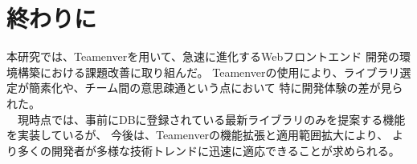\documentclass[main]{subfiles}
\begin{document}
\section{終わりに}
本研究では、Teamenverを用いて、急速に進化するWebフロントエンド
開発の環境構築における課題改善に取り組んだ。
Teamenverの使用により、ライブラリ選定が簡素化や、チーム間の意思疎通という点において
特に開発体験の差が見られた。\\
　現時点では、事前にDBに登録されている最新ライブラリのみを提案する機能を実装しているが、
今後は、Teamenverの機能拡張と適用範囲拡大により、
より多くの開発者が多様な技術トレンドに迅速に適応できることが求められる。
\end{document}
